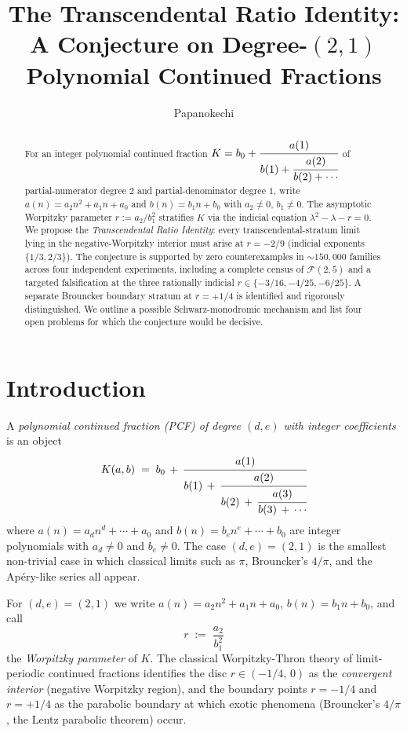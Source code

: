 \documentclass[11pt]{amsart}
\title[The Transcendental Ratio Identity]{The Transcendental Ratio
Identity: A Conjecture on Degree-$(2,1)$ Polynomial Continued Fractions}
\author{Papanokechi}
\theoremstyle{definition}
\theoremstyle{remark}
\newcommand{\FF}{\mathcal{F}}
\begin{document}
\begin{abstract}
For an integer polynomial continued fraction
$K = b_0 + \cfrac{a(1)}{b(1) + \cfrac{a(2)}{b(2) + \cdots}}$
of partial-numerator degree $2$ and partial-denominator degree $1$,
write $a(n) = a_2 n^2 + a_1 n + a_0$ and $b(n) = b_1 n + b_0$ with
$a_2 \ne 0$, $b_1 \ne 0$.  The asymptotic Worpitzky parameter
$r := a_2 / b_1^2$ stratifies $K$ via the indicial equation
$\lambda^2 - \lambda - r = 0$.  We propose the
\emph{Transcendental Ratio Identity}: every transcendental-stratum
limit lying in the negative-Worpitzky interior must arise at
$r = -2/9$ (indicial exponents $\{1/3, 2/3\}$).  The conjecture is
supported by zero counterexamples in $\sim 150{,}000$ families
across four independent experiments, including a complete census of
$\FF(2,5)$ and a targeted falsification at the three rationally
indicial $r \in \{-3/16, -4/25, -6/25\}$.  A separate Brouncker
boundary stratum at $r = +1/4$ is identified and rigorously
distinguished.  We outline a possible Schwarz-monodromic mechanism
and list four open problems for which the conjecture would be
decisive.
\end{abstract}

\maketitle

\section{Introduction}

A \emph{polynomial continued fraction (PCF) of degree $(d, e)$ with
integer coefficients} is an object
\begin{equation}\label{eq:pcf}
  K(a, b) \;=\; b_0 \,+\, \cfrac{a(1)}{b(1) \,+\, \cfrac{a(2)}{b(2)
  \,+\, \cfrac{a(3)}{b(3) \,+\, \cdots}}}
\end{equation}
where
\(
a(n) = a_d n^d + \cdots + a_0
\)
and
\(
b(n) = b_e n^e + \cdots + b_0
\)
are integer polynomials with $a_d \ne 0$ and $b_e \ne 0$.  The case
$(d,e) = (2,1)$ is the smallest non-trivial case in which classical
limits such as $\pi$, Brouncker's $4/\pi$, and the Ap\'ery-like series
all appear.

For $(d,e) = (2,1)$ we write $a(n) = a_2 n^2 + a_1 n + a_0$,
$b(n) = b_1 n + b_0$, and call
\begin{equation}\label{eq:r-defn}
  r \;:=\; \frac{a_2}{b_1^2}
\end{equation}
the \emph{Worpitzky parameter} of $K$.  The classical Worpitzky-Thron
theory of limit-periodic continued fractions identifies the disc
$r \in (-1/4,\,0)$ as the \emph{convergent interior} (negative
Worpitzky region), and the boundary points $r = -1/4$ and $r = +1/4$
as the parabolic boundary at which exotic phenomena (Brouncker's
$4/\pi$, the Lentz parabolic theorem) occur.
\end{document}
